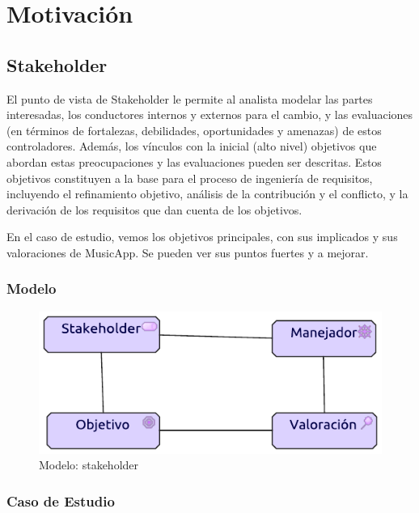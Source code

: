 \chapter{Motivación}
\section{Stakeholder}
El punto de vista de Stakeholder le permite al analista modelar las partes interesadas, los conductores internos y externos para el cambio, y las evaluaciones (en términos de fortalezas, debilidades, oportunidades y amenazas) de estos controladores. Además, los vínculos con la inicial (alto nivel) objetivos que abordan estas preocupaciones y las evaluaciones pueden ser descritas. Estos objetivos constituyen a la base para el proceso de ingeniería de requisitos, incluyendo el refinamiento objetivo, análisis de la contribución y el conflicto, y la derivación de los requisitos que dan cuenta de los objetivos. \cite{ArchiMat55:online} \vspace{\baselineskip}

En el caso de estudio, vemos los objetivos principales, con sus implicados y sus valoraciones de MusicApp. Se pueden ver sus puntos fuertes y a mejorar.

\newpage
\subsection{Modelo}
\begin{figure}[h!]
	\centering
	\includegraphics[width=0.6\linewidth]{Arquitectura/Motivacion/imgs/stakeholderMetamodelo.pdf}
	\caption{Modelo: stakeholder}
\end{figure}
\subsection{Caso de Estudio}

